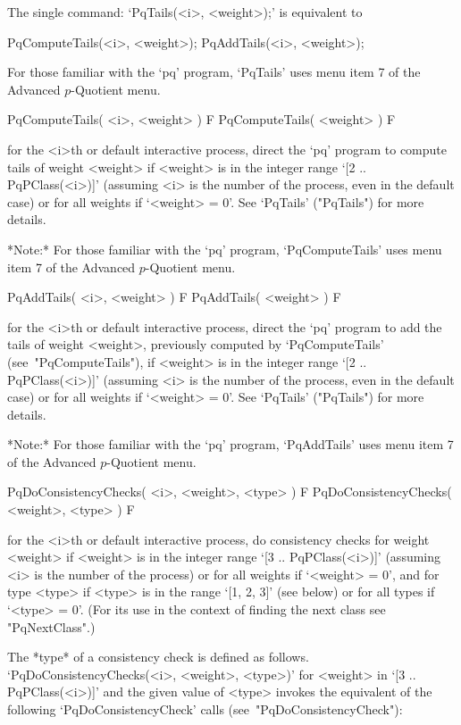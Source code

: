 The single command: `PqTails(<i>, <weight>);' is equivalent to

PqComputeTails(<i>, <weight>);
PqAddTails(<i>, <weight>);

For those familiar with the `pq' program, `PqTails' uses menu  item  7  of
the Advanced $p$-Quotient menu.

\>PqComputeTails( <i>, <weight> ) F
\>PqComputeTails( <weight> ) F

for the <i>th or default interactive {\ANUPQ} process,  direct  the  `pq'
program to compute tails of weight <weight> if <weight> is in the  integer
range `[2 .. PqPClass(<i>)]' (assuming <i> is the number of the  process,
even in the default case) or for all  weights  if  `<weight>  =  0'.  See
`PqTails' ("PqTails") for more details.

*Note:*
For those familiar with the `pq' program, `PqComputeTails' uses menu  item
7 of the Advanced $p$-Quotient menu.

\>PqAddTails( <i>, <weight> ) F
\>PqAddTails( <weight> ) F

for the <i>th or default interactive {\ANUPQ} process,  direct  the  `pq'
program to add the  tails  of  weight  <weight>,  previously  computed  by
`PqComputeTails' (see~"PqComputeTails"), if <weight> is  in  the  integer
range `[2 .. PqPClass(<i>)]' (assuming <i> is the number of the  process,
even in the default case) or for all  weights  if  `<weight>  =  0'.  See
`PqTails' ("PqTails") for more details.

*Note:*
For those familiar with the `pq' program, `PqAddTails' uses menu item 7 of
the Advanced $p$-Quotient menu.

\>PqDoConsistencyChecks( <i>, <weight>, <type> ) F
\>PqDoConsistencyChecks( <weight>, <type> ) F

for the <i>th or default interactive  {\ANUPQ}  process,  do  consistency
checks for weight <weight> if <weight> is in the  integer  range  `[3  ..
PqPClass(<i>)]' (assuming <i> is the number of the process)  or  for  all
weights if `<weight> = 0', and for type <type> if <type> is in the  range
`[1, 2, 3]' (see below) or for all types if `<type> = 0'. (For its use in
the context of finding the next class see "PqNextClass".)

The  *type*   of   a   consistency   check   is   defined   as   follows.
`PqDoConsistencyChecks(<i>, <weight>, <type>)' for  <weight>  in  `[3  ..
PqPClass(<i>)]' and the given value of <type> invokes the  equivalent  of
the following `PqDoConsistencyCheck' calls (see~"PqDoConsistencyCheck"):

